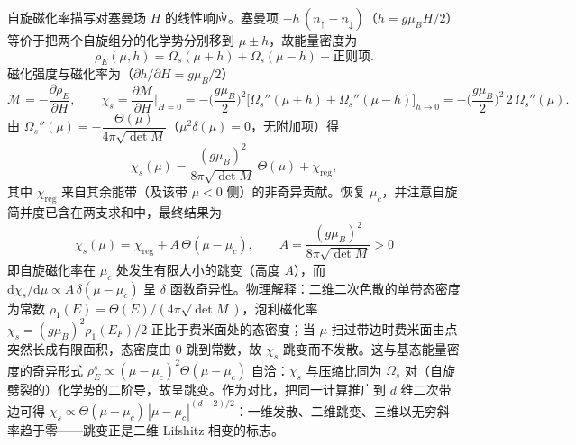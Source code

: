 自旋磁化率描写对塞曼场 $H$ 的线性响应。塞曼项 $-h\,(n_\uparrow-n_\downarrow)$（$h=g\mu_B H/2$）等价于把两个自旋组分的化学势分别移到 $\mu\pm h$，故能量密度为
\begin{equation*}
\rho_E(\mu,h)=\varOmega_s(\mu+h)+\varOmega_s(\mu-h)+\text{正则项}.
\end{equation*}
磁化强度与磁化率为（$\partial h/\partial H=g\mu_B/2$）
\begin{equation*}
\mathcal{M}=-\frac{\partial\rho_E}{\partial H},\qquad
\chi_s=\frac{\partial\mathcal{M}}{\partial H}\Big|_{H=0}
=-\Big(\frac{g\mu_B}{2}\Big)^{2}\Big[\varOmega_s''(\mu+h)+\varOmega_s''(\mu-h)\Big]_{h\to0}
=-\Big(\frac{g\mu_B}{2}\Big)^{2}\,2\,\varOmega_s''(\mu).
\end{equation*}
由 $\varOmega_s''(\mu)=-\dfrac{\Theta(\mu)}{4\pi\sqrt{\det M}}$（$\mu^2\delta(\mu)=0$，无附加项）得
\begin{equation*}
\chi_s(\mu)=\frac{(g\mu_B)^2}{8\pi\sqrt{\det M}}\,\Theta(\mu)+\chi_{\mathrm{reg}},
\end{equation*}
其中 $\chi_{\mathrm{reg}}$ 来自其余能带（及该带 $\mu<0$ 侧）的非奇异贡献。恢复 $\mu_c$，并注意自旋简并度已含在两支求和中，最终结果为
\begin{equation*}
\boxed{\;\chi_s(\mu)=\chi_{\mathrm{reg}}+A\,\Theta(\mu-\mu_c),\qquad
A=\frac{(g\mu_B)^2}{8\pi\sqrt{\det M}}>0\;}
\end{equation*}
即自旋磁化率在 $\mu_c$ 处发生有限大小的跳变（高度 $A$），而 $\mathrm{d}\chi_s/\mathrm{d}\mu\propto A\,\delta(\mu-\mu_c)$ 呈 $\delta$ 函数奇异性。物理解释：二维二次色散的单带态密度为常数 $\rho_1(E)=\Theta(E)/(4\pi\sqrt{\det M})$，泡利磁化率 $\chi_s=(g\mu_B)^2\rho_1(E_F)/2$ 正比于费米面处的态密度；当 $\mu$ 扫过带边时费米面由点突然长成有限面积，态密度由 $0$ 跳到常数，故 $\chi_s$ 跳变而不发散。这与基态能量密度的奇异形式 $\rho_E^s\propto(\mu-\mu_c)^2\Theta(\mu-\mu_c)$ 自洽：$\chi_s$ 与压缩比同为 $\varOmega_s$ 对（自旋劈裂的）化学势的二阶导，故呈跳变。作为对比，把同一计算推广到 $d$ 维二次带边可得 $\chi_s\propto\Theta(\mu-\mu_c)\,|\mu-\mu_c|^{(d-2)/2}$：一维发散、二维跳变、三维以无穷斜率趋于零——跳变正是二维 Lifshitz 相变的标志。
